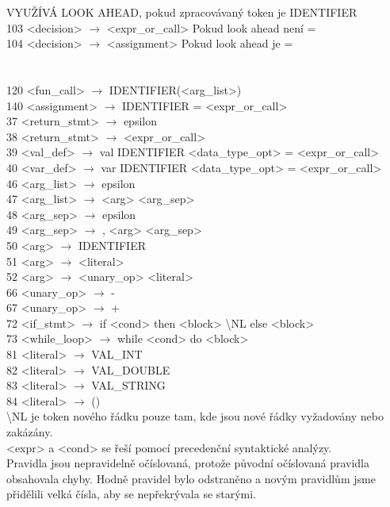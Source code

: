 \documentclass[10pt,a4paper]{article}
\begin{document}
VYUŽÍVÁ LOOK AHEAD, pokud zpracovávaný token je IDENTIFIER\\
103 <decision> $\to$ <expr\_or\_call> \hspace{0.7cm}  Pokud look ahead není =\\
104 <decision> $\to$ <assignment> \hspace{0.7cm}  Pokud look ahead je =\\
\\
\\

120 <fun\_call> $\to$ IDENTIFIER(<arg\_list>)\\
140 <assignment> $\to$ IDENTIFIER = <expr\_or\_call>\\

37 <return\_stmt> $\to$ epsilon\\
38 <return\_stmt> $\to$ <expr\_or\_call>\\
39 <val\_def> $\to$ val IDENTIFIER <data\_type\_opt> = <expr\_or\_call>\\
40 <var\_def> $\to$ var IDENTIFIER <data\_type\_opt> = <expr\_or\_call>\\

46 <arg\_list> $\to$ epsilon\\
47 <arg\_list> $\to$ <arg> <arg\_sep>\\
48 <arg\_sep> $\to$ epsilon\\
49 <arg\_sep> $\to$ , <arg> <arg\_sep>\\
50 <arg> $\to$ IDENTIFIER\\
51 <arg> $\to$ <literal>\\
52 <arg> $\to$ <unary\_op> <literal>\\

66 <unary\_op> $\to$ -\\
67 <unary\_op> $\to$ +\\

72 <if\_stmt> $\to$ if <cond> then <block> \textbackslash NL else <block>\\
73 <while\_loop> $\to$ while <cond> do <block>\\

81 <literal> $\to$ VAL\_INT\\
82 <literal> $\to$ VAL\_DOUBLE\\
83 <literal> $\to$ VAL\_STRING\\
84 <literal> $\to$ ()\\

\textbackslash NL je token nového řádku pouze tam, kde jsou nové řádky
 vyžadovány nebo zakázány.\\
<expr> a <cond> se řeší pomocí precedenční syntaktické analýzy.\\
Pravidla jsou nepravidelně očíslovaná, protože původní očíslovaná pravidla obsahovala
chyby. Hodně pravidel bylo odstraněno a novým pravidlům jsme přidělili velká čísla,
aby se nepřekrývala se starými.
\end{document}

